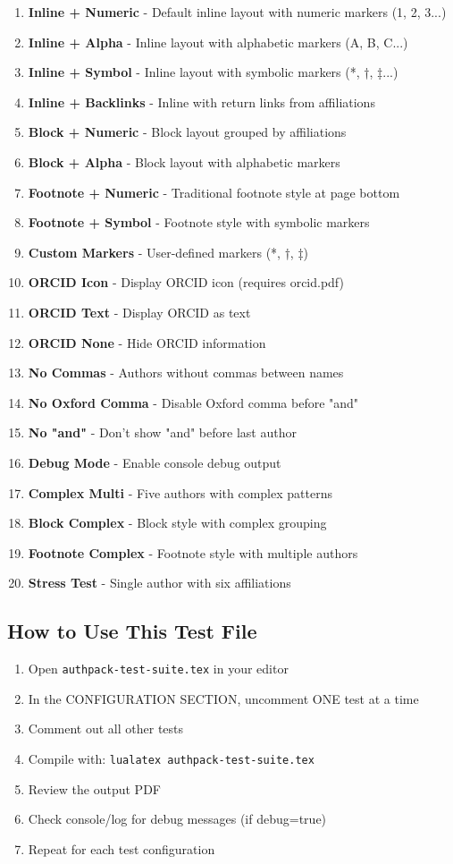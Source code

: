 \documentclass{article}
\begin{document}
\begin{enumerate}
\item \textbf{Inline + Numeric} - Default inline layout with numeric markers (1, 2, 3...)
\item \textbf{Inline + Alpha} - Inline layout with alphabetic markers (A, B, C...)
\item \textbf{Inline + Symbol} - Inline layout with symbolic markers (*, †, ‡...)
\item \textbf{Inline + Backlinks} - Inline with return links from affiliations
\item \textbf{Block + Numeric} - Block layout grouped by affiliations
\item \textbf{Block + Alpha} - Block layout with alphabetic markers
\item \textbf{Footnote + Numeric} - Traditional footnote style at page bottom
\item \textbf{Footnote + Symbol} - Footnote style with symbolic markers
\item \textbf{Custom Markers} - User-defined markers (*, †, ‡)
\item \textbf{ORCID Icon} - Display ORCID icon (requires orcid.pdf)
\item \textbf{ORCID Text} - Display ORCID as text
\item \textbf{ORCID None} - Hide ORCID information
\item \textbf{No Commas} - Authors without commas between names
\item \textbf{No Oxford Comma} - Disable Oxford comma before "and"
\item \textbf{No "and"} - Don't show "and" before last author
\item \textbf{Debug Mode} - Enable console debug output
\item \textbf{Complex Multi} - Five authors with complex patterns
\item \textbf{Block Complex} - Block style with complex grouping
\item \textbf{Footnote Complex} - Footnote style with multiple authors
\item \textbf{Stress Test} - Single author with six affiliations
\end{enumerate}

\subsection*{How to Use This Test File}

\begin{enumerate}
\item Open \texttt{authpack-test-suite.tex} in your editor
\item In the CONFIGURATION SECTION, uncomment ONE test at a time
\item Comment out all other tests
\item Compile with: \texttt{lualatex authpack-test-suite.tex}
\item Review the output PDF
\item Check console/log for debug messages (if debug=true)
\item Repeat for each test configuration
\end{enumerate}
\end{document}
